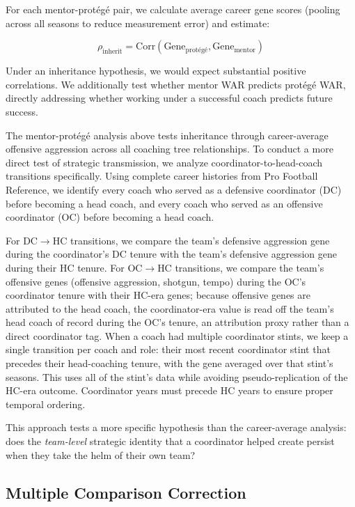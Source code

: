 \documentclass[USenglish]{article}
\theoremstyle{dgthm}
\theoremstyle{dgdef}
\begin{document}
For each mentor-prot\'{e}g\'{e} pair, we calculate average career gene scores (pooling across all seasons to reduce measurement error) and estimate:

\begin{equation}
\rho_{\text{inherit}} = \text{Corr}(\text{Gene}_{\text{prot\'{e}g\'{e}}}, \text{Gene}_{\text{mentor}})
\end{equation}

Under an inheritance hypothesis, we would expect substantial positive correlations. We additionally test whether mentor WAR predicts prot\'{e}g\'{e} WAR, directly addressing whether working under a successful coach predicts future success.

The mentor-prot\'{e}g\'{e} analysis above tests inheritance through career-average offensive aggression across all coaching tree relationships. To conduct a more direct test of strategic transmission, we analyze coordinator-to-head-coach transitions specifically. Using complete career histories from Pro Football Reference, we identify every coach who served as a defensive coordinator (DC) before becoming a head coach, and every coach who served as an offensive coordinator (OC) before becoming a head coach.

For DC$\rightarrow$HC transitions, we compare the team's defensive aggression gene during the coordinator's DC tenure with the team's defensive aggression gene during their HC tenure. For OC$\rightarrow$HC transitions, we compare the team's offensive genes (offensive aggression, shotgun, tempo) during the OC's coordinator tenure with their HC-era genes; because offensive genes are attributed to the head coach, the coordinator-era value is read off the team's head coach of record during the OC's tenure, an attribution proxy rather than a direct coordinator tag. When a coach had multiple coordinator stints, we keep a single transition per coach and role: their most recent coordinator stint that precedes their head-coaching tenure, with the gene averaged over that stint's seasons. This uses all of the stint's data while avoiding pseudo-replication of the HC-era outcome. Coordinator years must precede HC years to ensure proper temporal ordering.

This approach tests a more specific hypothesis than the career-average analysis: does the \emph{team-level} strategic identity that a coordinator helped create persist when they take the helm of their own team?

\subsection{Multiple Comparison Correction}
\end{document}
